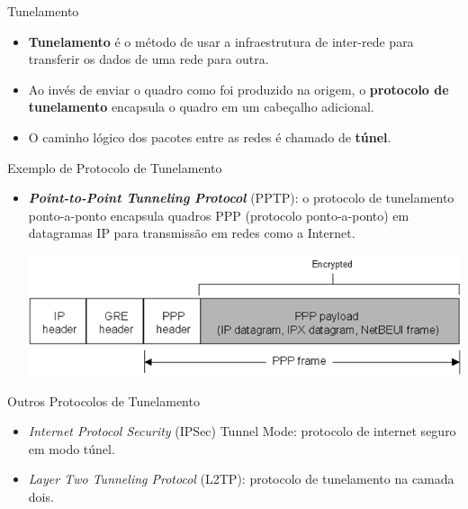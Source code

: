 \begin{frame}{Tunelamento}

  \begin{itemize}[<+->]
  \item {\bf Tunelamento} é o método de usar a infraestrutura de inter-rede
    para transferir os dados de uma rede para outra.
  \item Ao invés de enviar o quadro como foi produzido na origem, o
    {\bf protocolo de tunelamento} encapsula o quadro em um cabeçalho
    adicional.
\item O caminho lógico dos pacotes entre as redes é chamado de {\bf túnel}.
  \end{itemize}
 
\end{frame}

\begin{frame}{Exemplo de Protocolo de Tunelamento}
  \begin{itemize}
  \item {\bf\em Point-to-Point Tunneling Protocol} (PPTP): o protocolo de
    tunelamento ponto-a-ponto encapsula quadros PPP (protocolo
    ponto-a-ponto) em datagramas IP para transmissão em redes como a
    Internet.

    \bigskip
    \includegraphics[scale=.45]{img/pptp.png}

  \end{itemize}

\end{frame}

\begin{frame}{Outros Protocolos de Tunelamento}
  \begin{itemize}[<+->]
  \item {\em Internet Protocol Security} (IPSec) Tunnel Mode:
    protocolo de internet seguro em modo túnel.
  \item {\em Layer Two Tunneling Protocol} (L2TP): protocolo de
    tunelamento na camada dois.
  \end{itemize}
\end{frame}

